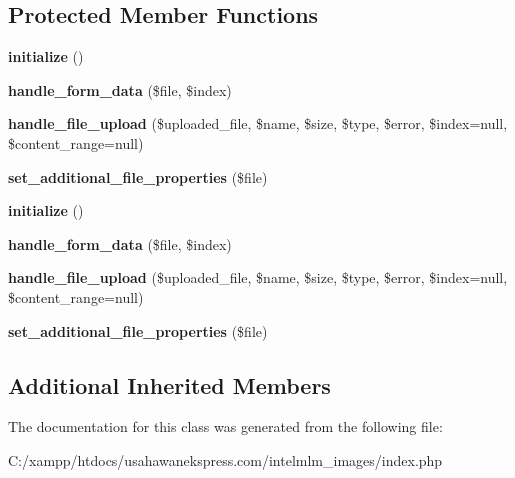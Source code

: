 \subsection*{Protected Member Functions}
\begin{DoxyCompactItemize}
\item 
\hypertarget{class_custom_upload_handler_a91098fa7d1917ce4833f284bbef12627}{{\bfseries initialize} ()}\label{class_custom_upload_handler_a91098fa7d1917ce4833f284bbef12627}

\item 
\hypertarget{class_custom_upload_handler_a856f63c260031cbbf4762b47f3d7cbd0}{{\bfseries handle\-\_\-form\-\_\-data} (\$file, \$index)}\label{class_custom_upload_handler_a856f63c260031cbbf4762b47f3d7cbd0}

\item 
\hypertarget{class_custom_upload_handler_ad03bbc690543eac3e157c3b015d088a4}{{\bfseries handle\-\_\-file\-\_\-upload} (\$uploaded\-\_\-file, \$name, \$size, \$type, \$error, \$index=null, \$content\-\_\-range=null)}\label{class_custom_upload_handler_ad03bbc690543eac3e157c3b015d088a4}

\item 
\hypertarget{class_custom_upload_handler_aa05c4d932e762066ed2f52de2127b709}{{\bfseries set\-\_\-additional\-\_\-file\-\_\-properties} (\$file)}\label{class_custom_upload_handler_aa05c4d932e762066ed2f52de2127b709}

\item 
\hypertarget{class_custom_upload_handler_a91098fa7d1917ce4833f284bbef12627}{{\bfseries initialize} ()}\label{class_custom_upload_handler_a91098fa7d1917ce4833f284bbef12627}

\item 
\hypertarget{class_custom_upload_handler_a856f63c260031cbbf4762b47f3d7cbd0}{{\bfseries handle\-\_\-form\-\_\-data} (\$file, \$index)}\label{class_custom_upload_handler_a856f63c260031cbbf4762b47f3d7cbd0}

\item 
\hypertarget{class_custom_upload_handler_ad03bbc690543eac3e157c3b015d088a4}{{\bfseries handle\-\_\-file\-\_\-upload} (\$uploaded\-\_\-file, \$name, \$size, \$type, \$error, \$index=null, \$content\-\_\-range=null)}\label{class_custom_upload_handler_ad03bbc690543eac3e157c3b015d088a4}

\item 
\hypertarget{class_custom_upload_handler_aa05c4d932e762066ed2f52de2127b709}{{\bfseries set\-\_\-additional\-\_\-file\-\_\-properties} (\$file)}\label{class_custom_upload_handler_aa05c4d932e762066ed2f52de2127b709}

\end{DoxyCompactItemize}
\subsection*{Additional Inherited Members}


The documentation for this class was generated from the following file\-:\begin{DoxyCompactItemize}
\item 
C\-:/xampp/htdocs/usahawanekspress.\-com/intelmlm\-\_\-images/index.\-php\end{DoxyCompactItemize}
